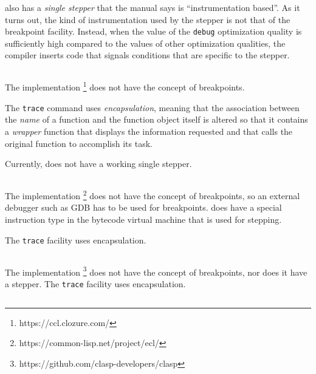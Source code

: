 \sbcl{} also has a \emph{single stepper} that the manual says is
``instrumentation based''.  As it turns out, the kind of
instrumentation used by the stepper is not that of the breakpoint
facility.  Instead, when the value of the \texttt{debug} optimization
quality is sufficiently high compared to the values of other
optimization qualities, the compiler inserts code that signals
conditions that are specific to the stepper.

\subsection{\ccl{}}
\label{sec-previous-ccl}

The \ccl{} \commonlisp{} implementation%
\footnote{https://ccl.clozure.com/}
does not have the concept of breakpoints.

The \ccl{} \texttt{trace} command uses \emph{encapsulation}, meaning
that the association between the \emph{name} of a function and the
function object itself is altered so that it contains a \emph{wrapper}
function that displays the information requested and that calls the
original function to accomplish its task.

Currently, \ccl{} does not have a working single stepper.

\subsection{\ecl{}}
\label{sec-previous-ecl}

The \ecl{} \commonlisp{} implementation%
\footnote{https://common-lisp.net/project/ecl/}
does not have the concept of breakpoints, so an external debugger such
as GDB has to be used for breakpoints.  \ecl{} does have a special
instruction type in the bytecode virtual machine that is used for
stepping.

The \texttt{trace} facility uses encapsulation.

\subsection{\clasp{}}

The \clasp{} \commonlisp{} implementation%
\footnote{https://github.com/clasp-developers/clasp}
does not have the concept of breakpoints, nor does it have a stepper.
The \texttt{trace} facility uses encapsulation.

\subsection{\lispworks{}}

